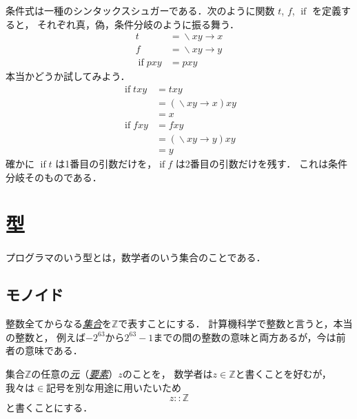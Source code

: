 \documentclass[a5paper,draft]{jsbook}
\newenvironment{leader}{\begingroup}{\endgroup}
\newcommand{\keyword}[1]{{\underline{\emph{#1}}}}
\newcommand{\mathSpecialSet}[1]{\mathbb{#1}} %
\DeclareMathOperator{\mathLambda}{\backslash}
\DeclareMathOperator{\mathIfFunc}{if}
\newcommand{\mathIn}{\mathrel{::}}
\newcommand{\mathLambdaArrow}{\rightarrow}
\newcommand{\mathLambdaExpression}[2]{\mathLambda#1\mathLambdaArrow#2}
\begin{document}
条件式は一種のシンタックスシュガーである．次のように関数 $t$, $f$, $\mathIfFunc$ を定義すると，
それぞれ真，偽，条件分岐のように振る舞う．
\begin{align}
t&=\mathLambdaExpression{xy}{x}\\
f&=\mathLambdaExpression{xy}{y}\\
\mathIfFunc pxy&=pxy
\end{align}
本当かどうか試してみよう．
\begin{align}
\mathIfFunc txy&=txy\\
&=\left(\mathLambdaExpression{xy}{x}\right)xy\\
&=x\\
\mathIfFunc fxy&=fxy\\
&=\left(\mathLambdaExpression{xy}{y}\right)xy\\
&=y
\end{align}
確かに $\mathIfFunc t$ は1番目の引数だけを，$\mathIfFunc f$ は2番目の引数だけを残す．
これは条件分岐そのものである．


\chapter{型}

\begin{leader}
プログラマのいう型とは，数学者のいう集合のことである．
\end{leader}

\section{モノイド}

整数全てからなる\keyword{集合}を$\mathSpecialSet{Z}$で表すことにする．
計算機科学で整数と言うと，本当の整数と，
例えば$-2^{63}$から$2^{63}-1$までの間の整数の意味と両方あるが，今は前者の意味である．

集合$\mathSpecialSet{Z}$の任意の\keyword{元}（\keyword{要素}）$z$のことを，
数学者は$z\in\mathSpecialSet{Z}$と書くことを好むが，
我々は$\in$記号を別な用途に用いたいため
\begin{equation}
\label{eq:totality}
z\mathIn\mathSpecialSet{Z}
\end{equation}
と書くことにする．
\end{document}
